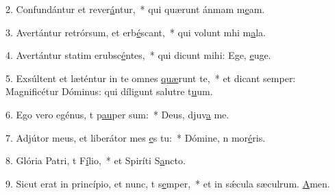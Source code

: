 2. Confundántur et rever\uline{á}ntur,~* qui quærunt ánmam m\uline{e}am.\par 
3. Avertántur retrórsum, et erb\uline{é}scant,~* qui volunt mhi m\uline{a}la.\par 
4. Avertántur statim erubsc\uline{é}ntes,~* qui dicunt mihi: Ege, \uline{e}uge.\par 
5. Exsúltent et læténtur in te omnes  \uline{quæ}runt te,~* et dicant semper: Magnificétur Dóminus: qui díligunt salutre t\uline{u}um.\par 
6. Ego vero egénus, t p\uline{au}per sum:~* Deus, djuv\uline{a} me.\par 
7. Adjútor meus, et liberátor mes \uline{e}s tu:~* Dómine, n mor\uline{é}ris.\par 
8. Glória Patri, t F\uline{í}lio,~* et Spiríti S\uline{a}ncto.\par 
9. Sicut erat in princípio, et nunc, t s\uline{e}mper,~* et in sǽcula sæculrum. \uline{A}men.\par 
